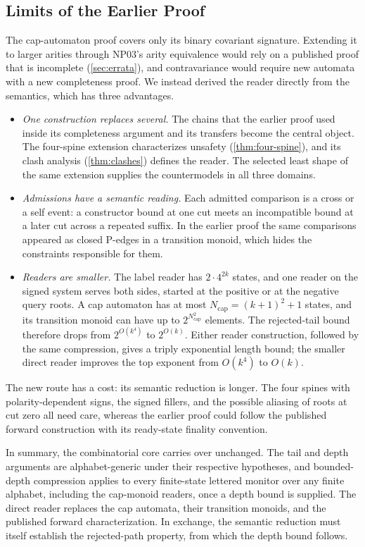 \subsection{Limits of the Earlier Proof}
\label{sec:why-route}
The cap-automaton proof covers only its binary covariant signature.
Extending it to larger arities through NP03's arity equivalence would rely
on a published proof that is incomplete (\cref{sec:errata}), and
contravariance would require new automata with a new completeness proof.
We instead derived the reader directly from the semantics, which has three
advantages.
\begin{itemize}[leftmargin=*]
\item \emph{One construction replaces several.} The chains that the earlier
  proof used inside its completeness argument and its transfers become the
  central object. The four-spine extension characterizes unsafety
  (\cref{thm:four-spine}), and its clash analysis (\cref{thm:clashes})
  defines the reader. The selected least shape of the same
  extension supplies the countermodels in all three domains.
\item \emph{Admissions have a semantic reading.} Each admitted comparison
  is a cross or a self event: a constructor bound at one cut meets an
  incompatible bound at a later cut across a repeated suffix. In the
  earlier proof the same comparisons appeared as closed P-edges in a
  transition monoid, which hides the constraints responsible for them.
\item \emph{Readers are smaller.} The label reader has $2\cdot4^{2k}$
  states, and one reader on the signed system serves both sides, started
  at the positive or at the negative query roots. A cap
  automaton has at most $N_{\mathrm{cap}}=(k+1)^2+1$ states, and its
  transition monoid can have up to $2^{N_{\mathrm{cap}}^2}$ elements. The
  rejected-tail bound therefore drops from $2^{O(k^4)}$ to $2^{O(k)}$.
  Either reader construction, followed by the same compression, gives a
  triply exponential length bound; the smaller direct reader improves the
  top exponent from $O(k^4)$ to $O(k)$.
\end{itemize}

The new route has a cost: its semantic reduction is longer. The four spines
with polarity-dependent signs, the signed fillers, and the possible
aliasing of roots at cut zero all need care, whereas the earlier proof
could follow the published forward construction with its ready-state
finality convention.

In summary, the combinatorial core carries over unchanged. The tail and depth
arguments are alphabet-generic under their respective hypotheses, and
bounded-depth compression applies to every finite-state lettered monitor over
any finite alphabet, including the cap-monoid readers, once a depth bound is
supplied. The direct reader replaces the cap automata, their transition
monoids, and the published forward characterization. In exchange, the
semantic reduction must itself establish the rejected-path property, from
which the depth bound follows.
